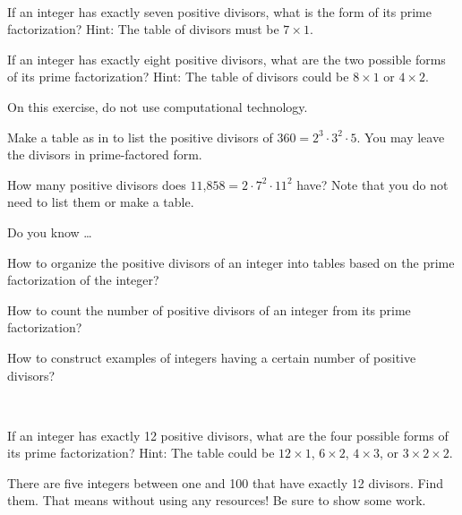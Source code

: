 \begin{exer}[\exerU] %
\label{exer_integers_7or8_divisors}
~
    \begin{exerpart}         
        \item If an integer has exactly seven positive divisors, what is the form of its prime factorization? Hint: The table of divisors must be $7 \times 1$.
        \item If an integer has exactly eight positive divisors, what are the two possible forms of its prime factorization?  Hint: The table of divisors could be $8 \times 1$ or $4 \times 2$.
    \end{exerpart}
\end{exer}

\begin{exer}[\exerU] %
\label{exer_table_divisors_3primes}
    On this exercise, do not use computational technology.
       \begin{exerpart}
           \item Make a table as in  to list the positive divisors of $360 = 2^3 \cdot 3^2 \cdot 5$.  You may leave the divisors in prime-factored form. 
           \item How many positive divisors does $\text{11,858} = 2\cdot 7^2 \cdot 11^2$ have?  Note that you do not need to list them or make a table. 
       \end{exerpart} 
\end{exer}

\begin{exer}[\exerR] %
\label{exer_dyk_list_count_div}
    Do you know \ldots
        \begin{exerpart}
            \item How to organize the positive divisors of an integer into tables based on the prime factorization of the integer?
            \item How to count the number of positive divisors of an integer from its prime factorization? 
            \item How to construct examples of integers having a certain number of positive divisors?
        \end{exerpart}
\end{exer}

\begin{exer}[\exerE] %
\label{exer_integers_12divisors}      
~
    \begin{exerpart}
        \item If an integer has exactly 12 positive divisors, what are the four possible forms of its prime factorization?  Hint: The table could be $12 \times 1$, $6 \times 2$, $4 \times 3$, or $3 \times 2 \times 2$.
        \item There are five integers between one and 100 that have exactly 12 divisors.  Find them. That means without using any resources! Be sure to show some work.
    \end{exerpart}
\end{exer}

